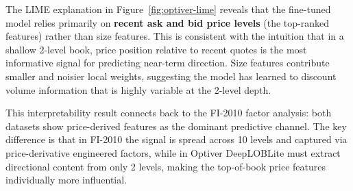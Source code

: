\documentclass[11pt]{article}
\begin{document}
The LIME explanation in Figure~\ref{fig:optiver-lime} reveals that the fine-tuned model relies primarily on \textbf{recent ask and bid price levels} (the top-ranked features) rather than size features. This is consistent with the intuition that in a shallow 2-level book, price position relative to recent quotes is the most informative signal for predicting near-term direction. Size features contribute smaller and noisier local weights, suggesting the model has learned to discount volume information that is highly variable at the 2-level depth.

This interpretability result connects back to the FI-2010 factor analysis: both datasets show price-derived features as the dominant predictive channel. The key difference is that in FI-2010 the signal is spread across 10 levels and captured via price-derivative engineered factors, while in Optiver DeepLOBLite must extract directional content from only 2 levels, making the top-of-book price features individually more influential.
\end{document}
